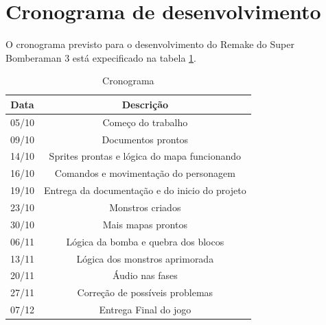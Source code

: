 \documentclass[12pt]{article}
\begin{document}
\section{Cronograma de desenvolvimento}
O cronograma previsto para o desenvolvimento do Remake do Super Bomberaman 3 está expecificado na tabela \ref{cronograma}.
\begin{table}[ht]
\centering
\vspace{0.5cm}
\begin{tabular}{|c|c|}
\hline   
\hline   
Data & Descrição \\
\hline   
05/10 & Começo do trabalho  \\
09/10 & Documentos prontos  \\
14/10 & Sprites prontas e lógica do mapa funcionando  \\
16/10 & Comandos e movimentação do personagem  \\
19/10 & Entrega da documentação e do inicio do projeto  \\
23/10 & Monstros criados   \\
30/10 & Mais mapas prontos  \\
06/11 & Lógica da bomba e quebra dos blocos \\
13/11 & Lógica dos monstros aprimorada  \\
20/11 & Áudio nas fases \\
27/11 & Correção de possíveis problemas \\
07/12 & Entrega Final do jogo \\
\hline   
\hline   
\end{tabular}
\label{cronograma}
\caption{Cronograma}
\end{table}
\end{document}
